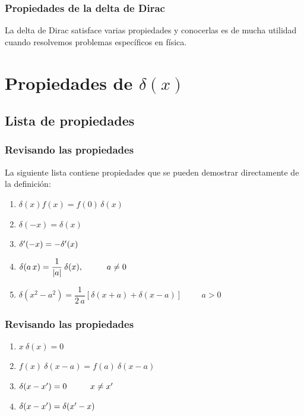 \documentclass[12pt]{beamer}
\begin{document}
\begin{frame}
\frametitle{Propiedades de la delta de Dirac}
La delta de Dirac satisface varias propiedades y conocerlas es de mucha utilidad cuando resolvemos problemas específicos en física. 
\end{frame}

\section{Propiedades de \texorpdfstring{$\delta (x)$}{d (x)}}
\subsection{Lista de propiedades}

\begin{frame}
\frametitle{Revisando las propiedades}
La siguiente lista contiene propiedades que se pueden demostrar directamente de la definición:
\pause
{}
\begin{enumerate}[<+->]
\item $\delta (x) f (x) = f (0) \, \delta (x)$
\item $\delta (-x) = \delta (x)$
\item ${\delta}^{\prime} (- x) = - {\delta}^{\prime} (x)$
\item $\delta(a \, x) = \dfrac{1}{\abs{a}} \: \delta (x), \hspace{1cm} a \neq 0$
\item $\delta (x^{2} - a^{2}) = \dfrac{1}{2 \, a} \left[ \delta (x + a) + \delta (x - a) \right] \hspace{1cm} a > 0$
\seti
\end{enumerate}
\end{frame}

\begin{frame}
\frametitle{Revisando las propiedades}
\begin{enumerate}[<+->]
\conti
\item $x \: \delta(x) = 0$
\item $f (x) \: \delta(x - a) = f(a) \: \delta(x - a)$
\item $\delta (x - {x}^{\prime}) = 0 \hspace{1cm} x \neq {x}^{\prime}$
\item $\delta (x - {x}^{\prime}) = \delta ({x}^{\prime} - x)$
\seti
\end{enumerate}
\end{frame}
\end{document}
